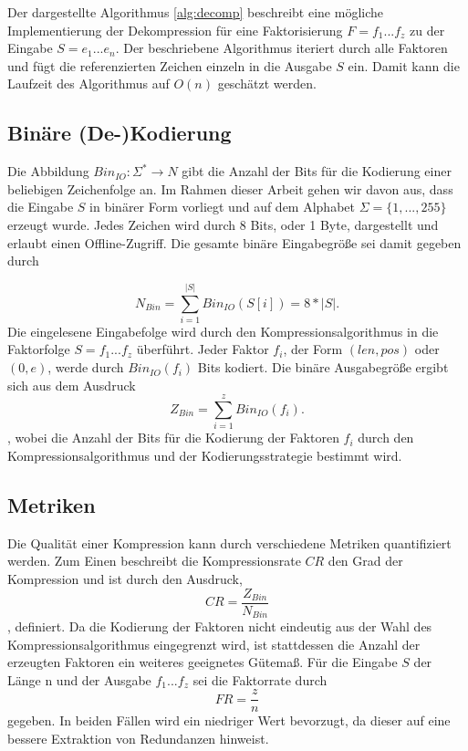 Der dargestellte Algorithmus \ref{alg:decomp} beschreibt eine mögliche Implementierung der Dekompression für eine Faktorisierung $F=f_1...f_z$ zu der Eingabe $S=e_1...e_n$.
Der beschriebene Algorithmus iteriert durch alle Faktoren und fügt die referenzierten Zeichen einzeln in die Ausgabe $S$ ein. Damit kann die Laufzeit des Algorithmus auf $O(n)$
geschätzt werden.

\subsection{Binäre (De-)Kodierung}
Die Abbildung $Bin_{IO}: \Sigma^* \rightarrow N$ gibt die Anzahl der Bits für die Kodierung einer beliebigen Zeichenfolge an. Im Rahmen dieser Arbeit gehen wir davon aus, dass die 
Eingabe $S$ in binärer Form vorliegt und auf dem Alphabet $\Sigma=\{1,...,255\}$ erzeugt wurde. Jedes Zeichen wird durch 8 Bits, oder 1 Byte, dargestellt und erlaubt einen 
Offline-Zugriff. Die gesamte binäre Eingabegröße sei damit gegeben durch 

\begin{equation}
    N_{Bin} = \sum_{i=1}^{|S|} Bin_{IO}(S[i]) = 8*|S|.
\end{equation}
Die eingelesene Eingabefolge wird durch den Kompressionsalgorithmus in die Faktorfolge $S=f_1...f_z$ überführt. Jeder Faktor $f_i$, der Form $(len, pos)$ oder $(0, e)$, werde 
durch $Bin_{IO}(f_i)$ Bits kodiert. Die binäre Ausgabegröße ergibt sich aus dem Ausdruck
\begin{equation}
    Z_{Bin} = \sum_{i=1}^{z} Bin_{IO}(f_i).
\end{equation}
, wobei die Anzahl der Bits für die Kodierung der Faktoren $f_i$ durch den Kompressionsalgorithmus und der Kodierungsstrategie bestimmt wird.

\subsection{Metriken}
Die Qualität einer Kompression kann durch verschiedene Metriken quantifiziert werden. Zum Einen beschreibt die Kompressionsrate $CR$ den Grad der Kompression und ist durch den
Ausdruck, 
\begin{equation}
    CR = \frac{Z_{Bin}}{N_{Bin}}
\end{equation}
, definiert.
Da die Kodierung der Faktoren nicht eindeutig aus der Wahl des Kompressionsalgorithmus eingegrenzt wird, ist stattdessen die Anzahl der erzeugten Faktoren ein
weiteres geeignetes Gütemaß. Für die Eingabe $S$ der Länge n und der Ausgabe $f_1...f_z$ sei die Faktorrate durch
\begin{equation}
    FR = \frac{z}{n}
\end{equation}
gegeben. In beiden Fällen wird ein niedriger Wert bevorzugt, da dieser auf eine bessere Extraktion von Redundanzen hinweist.

